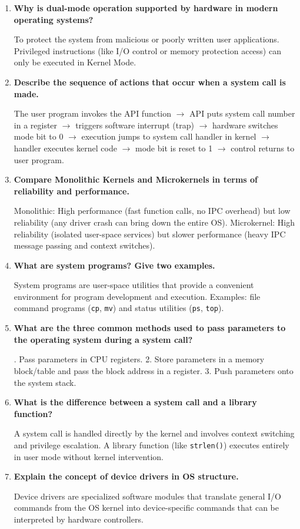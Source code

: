 \documentclass[12pt,a4paper]{article}
\newcommand{\Q}[1]{\textbf{#1}\par\noindent\ignorespaces}
\begin{document}
\begin{tcolorbox}[exambox, title={\textbf{Frequently Asked / Viva Questions}}]
\begin{enumerate}[topsep=0pt, label=\textbf{Q\arabic*.}, itemsep=5pt]
  \item \Q{Why is dual-mode operation supported by hardware in modern operating systems?}
    To protect the system from malicious or poorly written user applications. Privileged instructions (like I/O control or memory protection access) can only be executed in Kernel Mode.
  \item \Q{Describe the sequence of actions that occur when a system call is made.}
    The user program invokes the API function $\to$ API puts system call number in a register $\to$ triggers software interrupt (trap) $\to$ hardware switches mode bit to 0 $\to$ execution jumps to system call handler in kernel $\to$ handler executes kernel code $\to$ mode bit is reset to 1 $\to$ control returns to user program.
  \item \Q{Compare Monolithic Kernels and Microkernels in terms of reliability and performance.}
    Monolithic: High performance (fast function calls, no IPC overhead) but low reliability (any driver crash can bring down the entire OS). Microkernel: High reliability (isolated user-space services) but slower performance (heavy IPC message passing and context switches).
  \item \Q{What are system programs? Give two examples.}
    System programs are user-space utilities that provide a convenient environment for program development and execution. Examples: file command programs (\texttt{cp}, \texttt{mv}) and status utilities (\texttt{ps}, \texttt{top}).
  \item \Q{What are the three common methods used to pass parameters to the operating system during a system call?}
    1. Pass parameters in CPU registers. 2. Store parameters in a memory block/table and pass the block address in a register. 3. Push parameters onto the system stack.
  \item \Q{What is the difference between a system call and a library function?}
    A system call is handled directly by the kernel and involves context switching and privilege escalation. A library function (like \texttt{strlen()}) executes entirely in user mode without kernel intervention.
  \item \Q{Explain the concept of device drivers in OS structure.}
    Device drivers are specialized software modules that translate general I/O commands from the OS kernel into device-specific commands that can be interpreted by hardware controllers.

\end{enumerate}
\end{tcolorbox}
\end{document}
